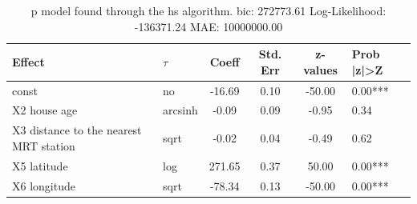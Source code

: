 \begin{table}
	\caption{p model found through the hs algorithm. bic: 272773.61 Log-Likelihood: -136371.24 MAE: 10000000.00}
	\begin{center}
		\begin{tabular}{|l|l|c|c|c|l|}
			\hline
			Effect & $\tau$ & Coeff & Std. Err & z-values & Prob |z|>Z \\
			\hline
			const & no & -16.69 & 0.10 & -50.00 & 0.00*** \\
			\hline
			X2 house age & arcsinh & -0.09 & 0.09 & -0.95 & 0.34 \\
			\hline
			X3 distance to the nearest MRT station & sqrt & -0.02 & 0.04 & -0.49 & 0.62 \\
			\hline
			X5 latitude & log & 271.65 & 0.37 & 50.00 & 0.00*** \\
			\hline
			X6 longitude & sqrt & -78.34 & 0.13 & -50.00 & 0.00*** \\
			\hline
		\end{tabular}
	\end{center}
\end{table}